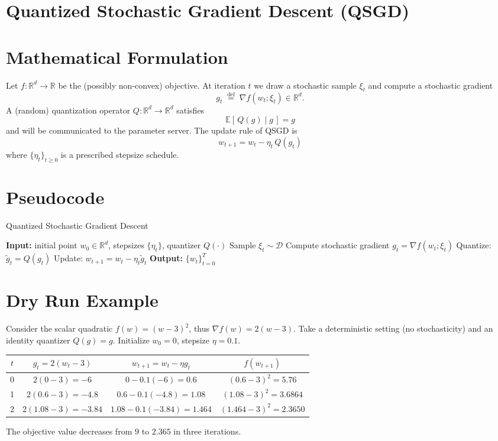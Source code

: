 \documentclass{article}
\newcommand{\E}{\mathbb{E}}
\newcommand{\R}{\mathbb{R}}
\begin{document}
\section*{Quantized Stochastic Gradient Descent (QSGD)}

\section*{Mathematical Formulation}
Let $f:\R^{d}\to\R$ be the (possibly non‑convex) objective.  
At iteration $t$ we draw a stochastic sample $\xi_{t}$ and compute a stochastic gradient
\[
g_{t}\;\stackrel{\text{def}}{=}\;\nabla f(w_{t};\xi_{t})\in\R^{d}.
\]
A (random) quantization operator $Q:\R^{d}\to\R^{d}$ satisfies  
\[
\boxed{\;\E[\,Q(g)\mid g\,]=g\;}\tag{1}
\]
and will be communicated to the parameter server.  
The update rule of QSGD is
\[
\boxed{\;w_{t+1}=w_{t}-\eta_{t}\,Q(g_{t})\;}\tag{2}
\]
where $\{\eta_{t}\}_{t\ge0}$ is a prescribed stepsize schedule.

\section*{Pseudocode}
\begin{algorithm}[H]
\caption{Quantized Stochastic Gradient Descent}
\begin{algorithmic}[1]
\State \textbf{Input:} initial point $w_{0}\in\R^{d}$, stepsizes $\{\eta_{t}\}$, quantizer $Q(\cdot)$
    \State Sample $\xi_{t}\sim\mathcal{D}$ 
    \State Compute stochastic gradient $g_{t}= \nabla f(w_{t};\xi_{t})$
    \State Quantize: $\tilde g_{t}= Q(g_{t})$   
    \State Update: $w_{t+1}= w_{t}-\eta_{t}\tilde g_{t}$
\EndFor
\State \textbf{Output:} $\{w_{t}\}_{t=0}^{T}$
\end{algorithmic}
\end{algorithm}

\section*{Dry Run Example}
Consider the scalar quadratic $f(w)=(w-3)^{2}$, thus $\nabla f(w)=2(w-3)$.  
Take a deterministic setting (no stochasticity) and an identity quantizer $Q(g)=g$.  
Initialize $w_{0}=0$, stepsize $\eta=0.1$.

\begin{center}
\begin{tabular}{c|c|c|c}
$t$ & $g_{t}=2(w_{t}-3)$ & $w_{t+1}=w_{t}-\eta g_{t}$ & $f(w_{t+1})$\\ \hline
0 & $2(0-3)=-6$ & $0-0.1(-6)=0.6$ & $(0.6-3)^{2}=5.76$\\
1 & $2(0.6-3)=-4.8$ & $0.6-0.1(-4.8)=1.08$ & $(1.08-3)^{2}=3.6864$\\
2 & $2(1.08-3)=-3.84$ & $1.08-0.1(-3.84)=1.464$ & $(1.464-3)^{2}=2.3650$\\
\end{tabular}
\end{center}
The objective value decreases from $9$ to $2.365$ in three iterations.
\end{document}
